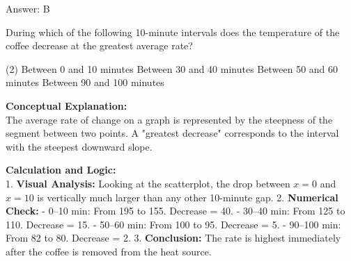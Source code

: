 \documentclass[11pt,paper=a4,answers]{exam}
\begin{document}
\begin{questions}
\begin{solution}
Answer: \colorbox{yellow!100}{B}
\end{solution}

\vspace{60pt}

\question
\begin{center}
\end{center}
During which of the following 10-minute intervals does the temperature of the coffee decrease at the greatest average rate?
\begin{tasks}(2)
    \task Between 0 and 10 minutes
    \task Between 30 and 40 minutes
    \task Between 50 and 60 minutes
    \task Between 90 and 100 minutes
\end{tasks}

\begin{solution}
\textbf{Conceptual Explanation:} \\
The average rate of change on a graph is represented by the steepness of the segment between two points. A "greatest decrease" corresponds to the interval with the steepest downward slope.

\vspace{30pt}

\textbf{Calculation and Logic:} \\
1. \textbf{Visual Analysis:} Looking at the scatterplot, the drop between $x=0$ and $x=10$ is vertically much larger than any other 10-minute gap.
2. \textbf{Numerical Check:} 
   - 0--10 min: From 195 to 155. Decrease = 40.
   - 30--40 min: From 125 to 110. Decrease = 15.
   - 50--60 min: From 100 to 95. Decrease = 5.
   - 90--100 min: From 82 to 80. Decrease = 2.
3. \textbf{Conclusion:} The rate is highest immediately after the coffee is removed from the heat source.

\vspace{30pt}


\end{solution}
\end{questions}
\end{document}
